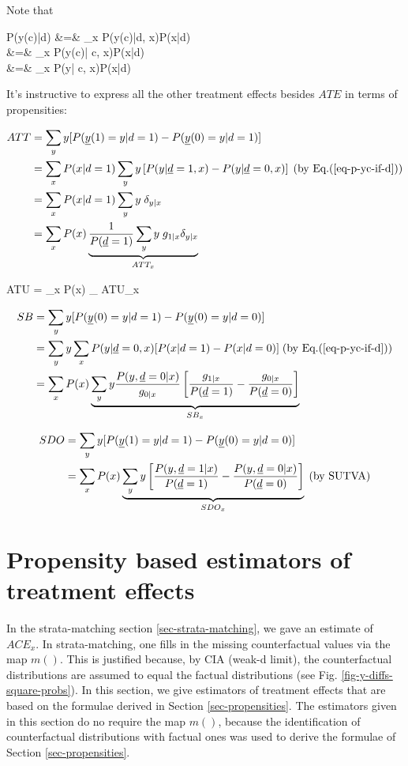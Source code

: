 Note that

\beqa
P(y(c)|d)
&=&
\sum_x P(y(c)|d, x)P(x|d)
\\
&=&
\sum_x P(y(c)| c, x)P(x|d) \;
\\
&=&
\sum_x P(y| c, x)P(x|d)\;
\label{eq-p-yc-if-d}
\eeqa

It's 
instructive
to express all the 
other treatment effects besides 
$ATE$ in terms of propensities: 

\begin{align}
ATT
&=
 \sum_y y [P({\underline{y}}(1)=y|d=1)
-P({\underline{y}}(0)=y|d=1)]
\\
&=
\sum_x P(x|d=1)
\sum_y y
\left[
P(y|{\underline{d}}=1,x)
-
P(y|{\underline{d}}=0,x)
\right]
\;\text{(by Eq.(\ref{eq-p-yc-if-d}))}
\\
&=
\sum_x P(x|d=1)
\sum_y y \;\delta_{y|x}
\\
&=
\sum_x P(x)
\underbrace{
\frac{1}{P({\underline{d}}=1)}
\sum_y y\; g_{1|x}\delta_{y|x}
}_
{ATT_x}
\end{align}

\beq
ATU
=
\sum_x P(x)
_
{ATU_x}
\eeq

\begin{align}
SB&= \sum_y y
[P({\underline{y}}(0)=y|d=1)-P({\underline{y}}(0)=y|d=0)]
\\
&=
\sum_y y
\sum_x P(y| {\underline{d}}=0,x)
[
P(x|d=1)-P(x|d=0)]
\;\text{(by Eq.(\ref{eq-p-yc-if-d}))}
\\
&=
\sum_x P(x)
\underbrace{\sum_y y
\frac{P(y, {\underline{d}}=0|x)}{g_{0|x}}
\left[
\frac{g_{1|x}}{P({\underline{d}}=1)}
-
\frac{g_{0|x}}{P({\underline{d}}=0)}
\right]}_{SB_x}
\end{align}

\begin{align}
SDO
&=
\sum_y y
[P({\underline{y}}(1)=y|d=1)-P({\underline{y}}(0)=y|d=0)]
\\
&=
\sum_x P(x)
\underbrace{\sum_y y
\left[
\frac{P(y, {\underline{d}}=1|x)}{P({\underline{d}}=1)}
-
\frac{P(y, {\underline{d}}=0|x)}{P({\underline{d}}=0)}
\right]}_{SDO_x}
\;\text{(by SUTVA)}
\end{align}

\section{Propensity based  estimators of
treatment effects}

In the  strata-matching
section \ref{sec-strata-matching}, we gave an estimate
of $ACE_x$.
In strata-matching, one 
fills in the missing 
counterfactual values
via the map $m()$.
This is justified 
because,
by CIA (weak-d limit),
the counterfactual
distributions 
are assumed to equal
the factual distributions (see Fig.
\ref{fig-y-diffs-square-probs}).
In this 
section,
we give estimators
of treatment effects that
are based on the  formulae derived
in Section \ref{sec-propensities}.
The estimators given in this section
do no require
the map $m()$, because
the identification of
counterfactual distributions
with factual ones was used to
derive the formulae
of  Section \ref{sec-propensities}.




